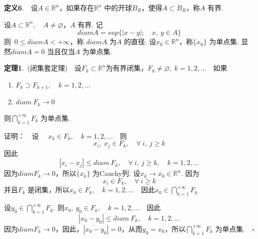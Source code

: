 \documentclass{article}
\begin{document}
\vspace{20pt}

\noindent \textbf{定义6}.\ \ 设\(A \in \mathbb{R}^n\)，如果存在\(\mathbb{R}^n\) 中的开球\(B_R\)，使得\(A \subset B_R\)，称\(A\) 有界.

\vspace{10pt}

\noindent 设\(A \subset \mathbb{R}^n,\quad A \neq \varnothing \)，\(A\) 有界. 记
\begin{equation*}
    diam A = sup \{| x - y |;\quad x,\ y \in A \}
\end{equation*}
则\ \(0 \le diam A <+ \infty \)，称 \(diam A\) 为\(A\) 的直径. 设\(x_0 \in \mathbb{R}^n\)，称\(\{x_0\} \) 为单点集. 显然\(diam A = 0\) 当且仅当\(A\) 为单点集.

\vspace{20pt}

\noindent \textbf{定理1}.\ (闭集套定理)\ \ 设\(F_k \subset \mathbb{R}^n\)为有界闭集，\(F_k \neq \varnothing ,\ k = 1,2,\dots \)\ \ 如果
\begin{enumerate}
    \item \(F_k \supset F_{k + 1},\quad k = 1,2,\dots\)
    \item \(diam\ F_k \to 0\)
\end{enumerate}
则\(\displaystyle\bigcap_{k = 1}^{ + \infty }F_{k}\) 为单点集.

\vspace{20pt}

\noindent 证明：\ \ 设 \ \ \(x_k \in F_k,\quad k = 1,2,\dots \)\ \ 则
\begin{equation*}
    x_i,\ x_j \in F_k,\quad \forall\ i,\ j \ge k
\end{equation*}
因此
\begin{equation*}
    | x_i - x_j | \le diam\ F_k,\quad \forall\ i,\ j \ge k,\quad k = 1,2,\dots
\end{equation*}
因为\(diam F_k \to 0\)，所以\(\{x_k\} \) 为Cauchy列. 设\(x_k \to x_0 \in \mathbb{R}^n\). 因为
\begin{equation*}
    x_i \in F_k,\quad \forall\ i \ge k
\end{equation*}
并且\(F_k\) 是闭集，所以\(x_0 \in F_k,\quad k = 1,2,\dots \)\ \ 因此\(x_0 \in \displaystyle\bigcap_{k = 1}^{ +\infty }F_k\)

\noindent 设\(y_0 \in \displaystyle\bigcap_{k = 1}^{ + \infty }F_k\). 则\(x_0,\ y_0 \in F_k,\quad k = 1,2,\dots \)\ \ 因此
\begin{equation*}
    |x_0 - y_0| \le diam\ F_k,\quad k = 1,2,\dots
\end{equation*}
因为\(diam F_k \to 0\)，因此，\(| x_0 - y_0 |= 0 \)，从而\(y_0 = x_0\)，所以\(\displaystyle\bigcap_{k = 1}^{ + \infty }F_k\) 为单点集.\(\quad \square\)
\end{document}
